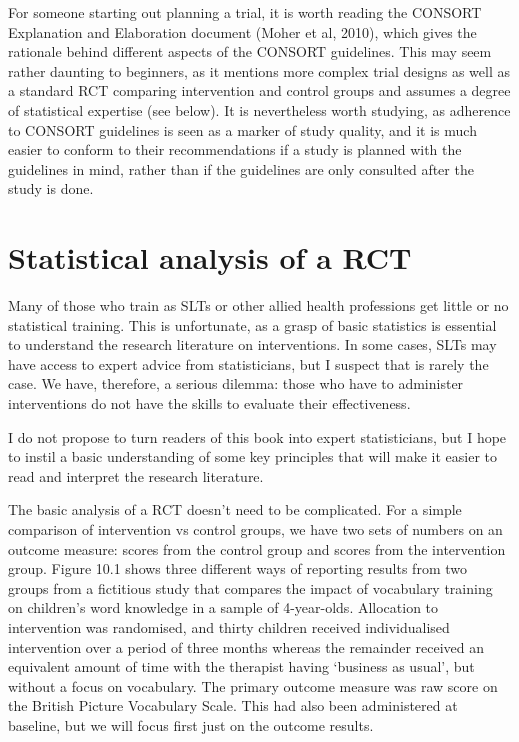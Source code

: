 \documentclass[]{book}
\begin{document}
For someone starting out planning a trial, it is worth reading the CONSORT Explanation and Elaboration document (Moher et al, 2010), which gives the rationale behind different aspects of the CONSORT guidelines. This may seem rather daunting to beginners, as it mentions more complex trial designs as well as a standard RCT comparing intervention and control groups and assumes a degree of statistical expertise (see below). It is nevertheless worth studying, as adherence to CONSORT guidelines is seen as a marker of study quality, and it is much easier to conform to their recommendations if a study is planned with the guidelines in mind, rather than if the guidelines are only consulted after the study is done.

\hypertarget{statistical-analysis-of-a-rct}{%
\section{Statistical analysis of a RCT}\label{statistical-analysis-of-a-rct}}

Many of those who train as SLTs or other allied health professions get little or no statistical training. This is unfortunate, as a grasp of basic statistics is essential to understand the research literature on interventions. In some cases, SLTs may have access to expert advice from statisticians, but I suspect that is rarely the case. We have, therefore, a serious dilemma: those who have to administer interventions do not have the skills to evaluate their effectiveness.

I do not propose to turn readers of this book into expert statisticians, but I hope to instil a basic understanding of some key principles that will make it easier to read and interpret the research literature.

The basic analysis of a RCT doesn't need to be complicated. For a simple comparison of intervention vs control groups, we have two sets of numbers on an outcome measure: scores from the control group and scores from the intervention group. Figure 10.1 shows three different ways of reporting results from two groups from a fictitious study that compares the impact of vocabulary training on children's word knowledge in a sample of 4-year-olds. Allocation to intervention was randomised, and thirty children received individualised intervention over a period of three months whereas the remainder received an equivalent amount of time with the therapist having `business as usual', but without a focus on vocabulary. The primary outcome measure was raw score on the British Picture Vocabulary Scale. This had also been administered at baseline, but we will focus first just on the outcome results.
\end{document}
